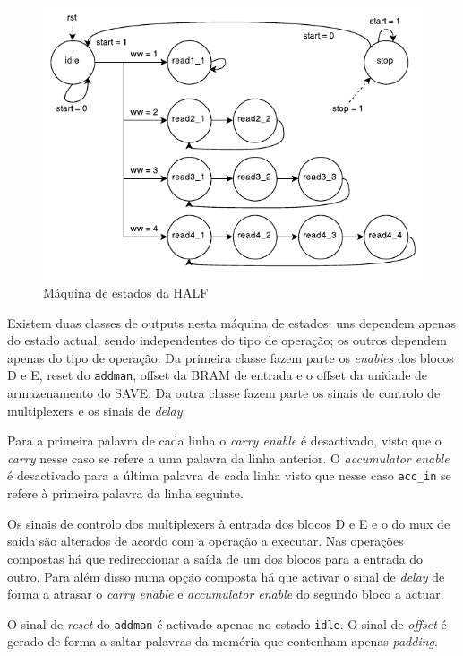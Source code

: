 \documentclass[a4paper]{article}
\begin{document}
\begin{figure}
	\centering
	\includegraphics[width=0.8\linewidth]{HALF_FSM}
	\caption{Máquina de estados da HALF}
	\label{fig:HALF_FSM}
\end{figure}

Existem duas classes de outputs nesta máquina de estados: uns dependem apenas do estado actual, sendo independentes do tipo de operação; os outros dependem apenas do tipo de operação. Da primeira classe fazem parte os \textit{enables} dos blocos D e E, reset do \texttt{addman}, offset da BRAM de entrada e o offset da unidade de armazenamento do SAVE. Da outra classe fazem parte os sinais de controlo de multiplexers e os sinais de \textit{delay}.

Para a primeira palavra de cada linha o \textit{carry enable} é desactivado, visto que o \textit{carry} nesse caso se refere a uma palavra da linha anterior. O \textit{accumulator enable} é desactivado para a última palavra de cada linha visto que nesse caso \texttt{acc\_in} se refere à primeira palavra da linha seguinte.

Os sinais de controlo dos multiplexers à entrada dos blocos D e E e o do mux de saída são alterados de acordo com a operação a executar. Nas operações compostas há que redireccionar a saída de um dos blocos para a entrada do outro. Para além disso numa opção composta há que activar o sinal de \textit{delay} de forma a atrasar o \textit{carry enable} e \textit{accumulator enable} do segundo bloco a actuar.

O sinal de \textit{reset} do \texttt{addman} é activado apenas no estado \texttt{idle}. O sinal de \textit{offset} é gerado de forma a saltar palavras da memória que contenham apenas \textit{padding}.
\end{document}

